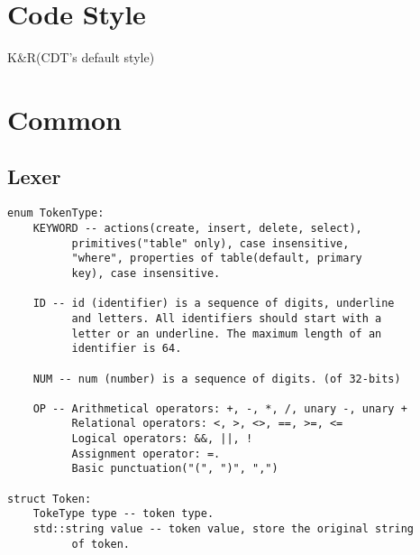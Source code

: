 \documentclass[12pt,a4paper,oneside,draft]{report}
\begin{document}
\section{Code Style}
K\&R(CDT's default style)\\ 

\section{Common}

\subsection{Lexer}
\begin{verbatim}
enum TokenType:
    KEYWORD -- actions(create, insert, delete, select),
          primitives("table" only), case insensitive,
          "where", properties of table(default, primary
          key), case insensitive. 
          
    ID -- id (identifier) is a sequence of digits, underline
          and letters. All identifiers should start with a
          letter or an underline. The maximum length of an
          identifier is 64.
          
    NUM -- num (number) is a sequence of digits. (of 32-bits)
    
    OP -- Arithmetical operators: +, -, *, /, unary -, unary +
          Relational operators: <, >, <>, ==, >=, <=
          Logical operators: &&, ||, !
          Assignment operator: =.
          Basic punctuation("(", ")", ",")

struct Token:
    TokeType type -- token type.
    std::string value -- token value, store the original string
          of token.

\end{verbatim}
\end{document}
